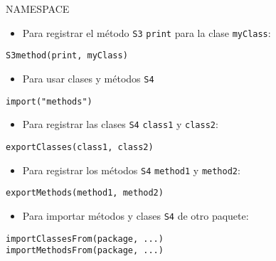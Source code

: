 \documentclass[xcolor={usenames,svgnames,dvipsnames}]{beamer}
\begin{document}
\begin{frame}[fragile,label={sec:org4ba52e9}]{NAMESPACE}
 \begin{itemize}
\item Para registrar el método \texttt{S3} \texttt{print} para la clase \texttt{myClass}:
\end{itemize}
\lstset{language=r,label= ,caption= ,captionpos=b,numbers=none}
\begin{lstlisting}
S3method(print, myClass)
\end{lstlisting}
\begin{itemize}
\item Para usar clases y métodos \texttt{S4}
\end{itemize}
\lstset{language=r,label= ,caption= ,captionpos=b,numbers=none}
\begin{lstlisting}
import("methods")
\end{lstlisting}
\begin{itemize}
\item Para registrar las clases \texttt{S4} \texttt{class1} y \texttt{class2}:
\end{itemize}
\lstset{language=r,label= ,caption= ,captionpos=b,numbers=none}
\begin{lstlisting}
exportClasses(class1, class2)
\end{lstlisting}
\begin{itemize}
\item Para registrar los métodos \texttt{S4} \texttt{method1} y \texttt{method2}:
\end{itemize}
\lstset{language=r,label= ,caption= ,captionpos=b,numbers=none}
\begin{lstlisting}
exportMethods(method1, method2)
\end{lstlisting}
\begin{itemize}
\item Para importar métodos y clases \texttt{S4} de otro paquete:
\end{itemize}
\lstset{language=r,label= ,caption= ,captionpos=b,numbers=none}
\begin{lstlisting}
importClassesFrom(package, ...)
importMethodsFrom(package, ...)
\end{lstlisting}
\end{frame}
\end{document}
